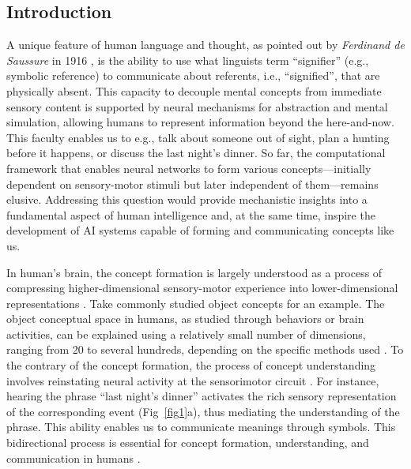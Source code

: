 \documentclass[pdflatex,sn-mathphys-num,lineno]{sn-jnl}%
\begin{document}
\begin{CJK}{UTF8}{gbsn}
\section{Introduction}\label{sec1}

A unique feature of human language and thought, as pointed out by \textit{Ferdinand de Saussure} in 1916 \cite{de1916course}, is the ability to use what linguists term “signifier” (e.g., symbolic reference) to communicate about referents, i.e., “signified”, that are physically absent. This capacity to decouple mental concepts from immediate sensory content is supported by neural mechanisms for abstraction and mental simulation, allowing humans to represent information beyond the here-and-now. This faculty enables us to e.g., talk about someone out of sight, plan a hunting before it happens, or discuss the last night’s dinner. So far, the computational framework that enables neural networks to form various concepts—initially dependent on sensory-motor stimuli but later independent of them—remains elusive. Addressing this question would provide mechanistic insights into a fundamental aspect of human intelligence and, at the same time, inspire the development of AI systems capable of forming and communicating concepts like us.

In human’s brain, the concept formation is largely understood as a process of compressing higher-dimensional sensory-motor experience into lower-dimensional representations \cite{piantadosi_why_2024,grill-spector_functional_2014,binder_neurobiology_2011,ralph_neural_2017}. Take commonly studied object concepts for an example. The object conceptual space in humans, as studied through behaviors or brain activities, can be explained using a relatively small number of dimensions, ranging from 20 to several hundreds, depending on the specific methods used \cite{mcrae_semantic_2005,devereux_centre_2014,binder_toward_2016,hebart_revealing_2020,haxby_common_2011}. To the contrary of the concept formation, the process of concept understanding involves reinstating neural activity at the sensorimotor circuit \cite{pulvermuller_brain_2005,kiefer_conceptual_2012,huth_natural_2016}. For instance, hearing the phrase “last night’s dinner” activates the rich sensory representation of the corresponding event (Fig~\ref{fig1}a), thus mediating the understanding of the phrase. This ability enables us to communicate meanings through symbols. This bidirectional process is essential for concept formation, understanding, and communication in humans \cite{barsalou_grounded_2008,martin_grapesgrounding_2016,ralph_neural_2017}.


\end{CJK}
\end{document}
